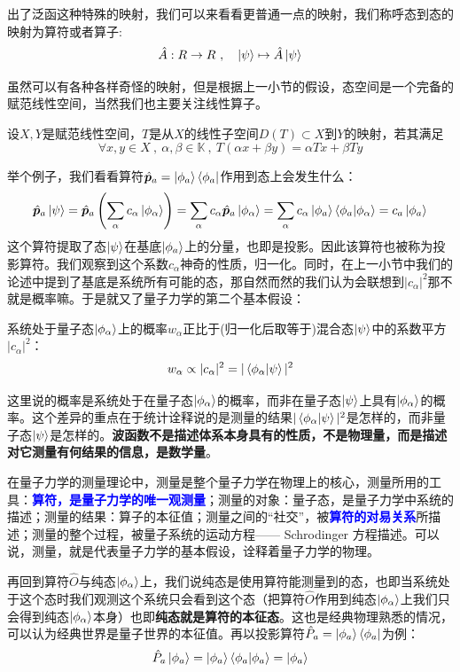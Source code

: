 出了泛函这种特殊的映射，我们可以来看看更普通一点的映射，我们称呼态到态的映射为算符或者算子:
\[\hat{A}:R \to R \ , \quad \ket{\psi} \mapsto \hat{A}\ket{\psi}\]

虽然可以有各种各样奇怪的映射，但是根据上一小节的假设，态空间是一个完备的赋范线性空间，当然我们也主要关注线性算子。
\begin{definition}[线性算子]
    设$X,Y$是赋范线性空间，$T$是从$X$的线性子空间$D(T) \subset X$到$Y$的映射，若其满足
    \[\forall x,y \in X \ , \ \alpha,\beta \in \mathbb{K} \ , \ T(\alpha x+\beta y)=\alpha Tx+\beta Ty\]
\end{definition}
举个例子，我们看看算符$\hat{\bm{p}}_a=\ket{\phi_a}\bra{\phi_a}$作用到态上会发生什么：
\[\hat{\bm{p}}_a\ket{\psi}=\hat{\bm{p}}_a\left(\sum_{\alpha}c_{\alpha}\ket{\phi_{\alpha}}\right)=\sum_{\alpha}c_{\alpha}\hat{\bm{p}}_a\ket{\phi_{\alpha}}=\sum_{\alpha}c_{\alpha}\ket{\phi_a}\bra{\phi_a}\ket{\phi_{\alpha}}=c_a\ket{\phi_a}\]
这个算符提取了态$\ket{\psi}$在基底$\ket{\phi_a}$上的分量，也即是投影。因此该算符也被称为投影算符。我们观察到这个系数$c_{\alpha}$神奇的性质，归一化。同时，在上一小节中我们的论述中提到了基底是系统所有可能的态，那自然而然的我们认为会联想到$|c_{\alpha}|^2$那不就是概率嘛。于是就又了量子力学的第二个基本假设：

\begin{theorem}[统计诠释]
系统处于量子态$\ket{\phi_{\alpha}}$上的概率$w_{\alpha}$正比于(归一化后取等于)混合态$\ket{\psi}$中的系数平方$|c_{\alpha}|^2$：
\[w_{\alpha}\propto|c_{\alpha}|^2=|\bra{\phi_{\alpha}}\ket{\psi}|^2\]
\end{theorem}

这里说的概率是系统处于在量子态$\ket{\phi_{\alpha}}$的概率，而非在量子态$\ket{\psi}$上具有$\ket{\phi_{\alpha}}$的概率。这个差异的重点在于统计诠释说的是测量的结果$|\bra{\phi_{\alpha}}\ket{\psi}|^2$是怎样的，而非量子态$\ket{\psi}$是怎样的。\textbf{波函数不是描述体系本身具有的性质，不是物理量，而是描述对它测量有何结果的信息，是数学量}。

在量子力学的测量理论中，测量是整个量子力学在物理上的核心，测量所用的工具：\textcolor{blue}{\textbf{算符，是量子力学的唯一观测量}}；测量的对象：量子态，是量子力学中系统的描述；测量的结果：算子的本征值；测量之间的“社交”，被\textcolor{blue}{\textbf{算符的对易关系}}所描述；测量的整个过程，被量子系统的运动方程—— Schrodinger 方程描述。可以说，测量，就是代表量子力学的基本假设，诠释着量子力学的物理。

再回到算符$\hat{O}$与纯态$\ket{\phi_{\alpha}}$上，我们说纯态是使用算符能测量到的态，也即当系统处于这个态时我们观测这个系统只会看到这个态（把算符$\hat{O}$作用到纯态$\ket{\phi_{\alpha}}$上我们只会得到纯态$\ket{\phi_{\alpha}}$本身）也即\textbf{纯态就是算符的本征态}。这也是经典物理熟悉的情况，可以认为经典世界是量子世界的本征值。再以投影算符$\hat{P}_a=\ket{\phi_a}\bra{\phi_a}$为例：
\[\hat{P}_a\ket{\phi_a}=\ket{\phi_a}\bra{\phi_a}\ket{\phi_a}=\ket{\phi_a}\]

